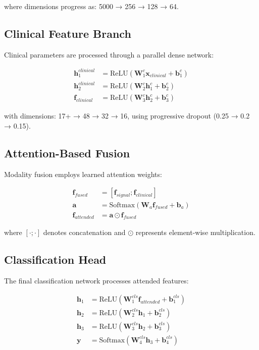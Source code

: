 \documentclass[12pt,a4paper]{article}
\begin{document}
where dimensions progress as: 5000 → 256 → 128 → 64.

\subsection{Clinical Feature Branch}
Clinical parameters are processed through a parallel dense network:

\begin{align}
\mathbf{h}_1^{clinical} &= \text{ReLU}(\mathbf{W}_1^c \mathbf{x}_{clinical} + \mathbf{b}_1^c) \\
\mathbf{h}_2^{clinical} &= \text{ReLU}(\mathbf{W}_2^c \mathbf{h}_1^c + \mathbf{b}_2^c) \\
\mathbf{f}_{clinical} &= \text{ReLU}(\mathbf{W}_3^c \mathbf{h}_2^c + \mathbf{b}_3^c)
\end{align}

with dimensions: 17+ → 48 → 32 → 16, using progressive dropout (0.25 → 0.2 → 0.15).

\subsection{Attention-Based Fusion}
Modality fusion employs learned attention weights:

\begin{align}
\mathbf{f}_{fused} &= [\mathbf{f}_{signal}; \mathbf{f}_{clinical}] \\
\mathbf{a} &= \text{Softmax}(\mathbf{W}_a \mathbf{f}_{fused} + \mathbf{b}_a) \\
\mathbf{f}_{attended} &= \mathbf{a} \odot \mathbf{f}_{fused}
\end{align}

where $[\cdot; \cdot]$ denotes concatenation and $\odot$ represents element-wise multiplication.

\subsection{Classification Head}
The final classification network processes attended features:

\begin{align}
\mathbf{h}_1 &= \text{ReLU}(\mathbf{W}_1^{cls} \mathbf{f}_{attended} + \mathbf{b}_1^{cls}) \\
\mathbf{h}_2 &= \text{ReLU}(\mathbf{W}_2^{cls} \mathbf{h}_1 + \mathbf{b}_2^{cls}) \\
\mathbf{h}_3 &= \text{ReLU}(\mathbf{W}_3^{cls} \mathbf{h}_2 + \mathbf{b}_3^{cls}) \\
\mathbf{y} &= \text{Softmax}(\mathbf{W}_4^{cls} \mathbf{h}_3 + \mathbf{b}_4^{cls})
\end{align}
\end{document}
